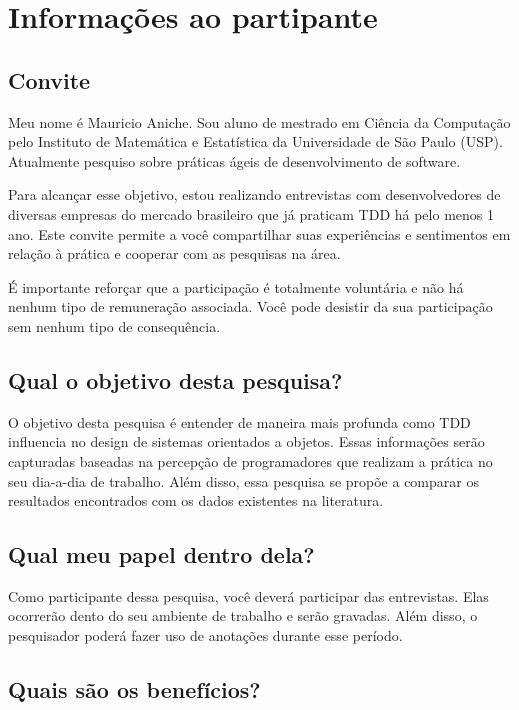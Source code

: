 \chapter{Informações ao partipante}
\label{ape:informacoes-participante}

\section{Convite}

Meu nome é Mauricio Aniche. Sou aluno de mestrado em Ciência da Computação pelo
Instituto de Matemática e Estatística da Universidade de São Paulo (USP).
Atualmente pesquiso sobre práticas ágeis de desenvolvimento de software.

Para alcançar esse objetivo, estou realizando entrevistas com desenvolvedores de
diversas empresas do mercado brasileiro que já praticam TDD há pelo menos 1 ano.
Este convite permite a você compartilhar suas experiências e sentimentos em
relação à prática e cooperar com as pesquisas na área.

É importante reforçar que a participação é totalmente voluntária e não há nenhum
tipo de remuneração associada. Você pode desistir da sua participação sem nenhum
tipo de consequência.

\section{Qual o objetivo desta pesquisa?}

O objetivo desta pesquisa é entender de maneira mais profunda como TDD
influencia no design de sistemas orientados a objetos. Essas informações serão
capturadas baseadas na percepção de programadores que realizam a prática no seu
dia-a-dia de trabalho. Além disso, essa pesquisa se propõe a comparar os
resultados encontrados com os dados existentes na literatura.

\section{Qual meu papel dentro dela?}

Como participante dessa pesquisa, você deverá participar das entrevistas. Elas
ocorrerão dento do seu ambiente de trabalho e serão gravadas. Além disso, o
pesquisador poderá fazer uso de anotações durante esse período.

\section{Quais são os benefícios?}

